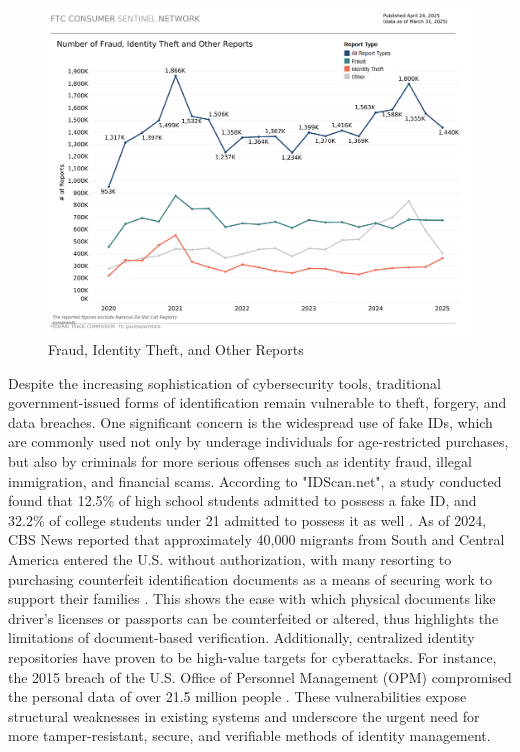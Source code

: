 \documentclass[conference]{IEEEtran}
\begin{document}
\begin{figure}[h!]
    \centering
    \includegraphics[width=0.9\linewidth]{Trends Over Time.png}
    \caption{Fraud, Identity Theft, and Other Reports}
    \label{fig:ID Theft}
\end{figure}

Despite the increasing sophistication of cybersecurity tools, traditional government-issued forms of identification remain vulnerable to theft, forgery, and data breaches. One significant concern is the widespread use of fake IDs, which are commonly used not only by underage individuals for age-restricted purchases, but also by criminals for more serious offenses such as identity fraud, illegal immigration, and financial scams. According to "IDScan.net", a study conducted found that 12.5\% of high school students admitted to possess a fake ID, and 32.2\% of college students under 21 admitted to possess it as well \cite{fake ID's}. As of 2024, CBS News reported that approximately 40,000 migrants from South and Central America entered the U.S. without authorization, with many resorting to purchasing counterfeit identification documents as a means of securing work to support their families \cite{cbs-news}. This shows the ease with which physical documents like driver's licenses or passports can be counterfeited or altered, thus highlights the limitations of document-based verification. Additionally, centralized identity repositories have proven to be high-value targets for cyberattacks. For instance, the 2015 breach of the U.S. Office of Personnel Management (OPM) compromised the personal data of over 21.5 million people \cite{opm}. These vulnerabilities expose structural weaknesses in existing systems and underscore the urgent need for more tamper-resistant, secure, and verifiable methods of identity management.
\end{document}
